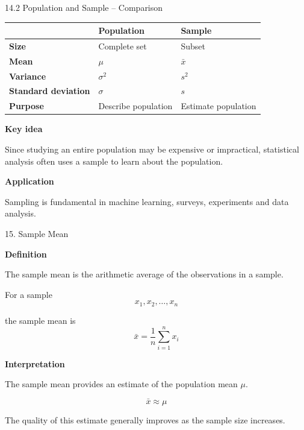 \begin{frame}{14.2 Population and Sample -- Comparison}

\small

\begin{table}
\centering

\begin{tabular}{>{\bfseries}l l l}
\toprule
 & Population & Sample \\
\midrule
Size & Complete set & Subset \\
Mean & $\mu$ & $\bar{x}$ \\
Variance & $\sigma^2$ & $s^2$ \\
Standard deviation & $\sigma$ & $s$ \\
Purpose & Describe population & Estimate population \\
\bottomrule
\end{tabular}

\end{table}

\vspace{0.5cm}

\textbf{Key idea}

Since studying an entire population may be expensive or
impractical, statistical analysis often uses a sample to
learn about the population.

\vspace{0.3cm}

\textbf{Application}

Sampling is fundamental in machine learning, surveys,
experiments and data analysis.

\end{frame}



\begin{frame}{15. Sample Mean}

\textbf{Definition}

The sample mean is the arithmetic average of the observations
in a sample.

For a sample
\[
x_1,x_2,\ldots,x_n
\]

the sample mean is
\[
\boxed{
\bar{x}
=
\frac{1}{n}
\sum_{i=1}^{n}x_i
}
\]

\vspace{0.1cm}

\textbf{Interpretation}

The sample mean provides an estimate of the population mean $\mu$.

\[
\boxed{
\bar{x}\approx\mu
}
\]

The quality of this estimate generally improves as the sample
size increases.

\end{frame}


